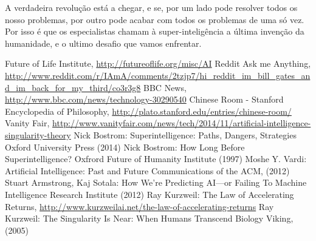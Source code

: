 \documentclass[runningheads,a4paper]{llncs}
\begin{document}
A verdadeira revolução está a chegar, e se, por um lado pode resolver todos os nosso problemas, por outro pode acabar com todos os problemas de uma só vez. Por isso é que os especialistas chamam à super-inteligência a última invenção da humanidade, e o ultimo desafio que vamos enfrentar.

\begin{thebibliography}{4}

   Future of Life Institute, \url{http://futureoflife.org/misc/AI}
   Reddit Ask me Anything, \url{http://www.reddit.com/r/IAmA/comments/2tzjp7/hi_reddit_im_bill_gates_and_im_back_for_my_third/co3r3g8}
   BBC News, \url{http://www.bbc.com/news/technology-30290540}
   Chinese Room - Stanford Encyclopedia of Philosophy, \url{http://plato.stanford.edu/entries/chinese-room/}
   Vanity Fair, \url{http://www.vanityfair.com/news/tech/2014/11/artificial-intelligence-singularity-theory}
   Nick Bostrom:
    Superintelligence: Paths, Dangers, Strategies
    Oxford University Press (2014)
   Nick Bostrom:
    How Long Before Superintelligence?
    Oxfrord Future of Humanity Institute (1997)
   Moshe Y. Vardi:
    Artificial Intelligence: Past and Future
    Communications of the ACM, (2012)
   Stuart Armstrong, Kaj Sotala:
    How We’re Predicting AI—or Failing To
    Machine Intelligence Research Institute (2012)
   Ray Kurzweil:
    The Law of Accelerating Returns,
    \url{http://www.kurzweilai.net/the-law-of-accelerating-returns}
   Ray Kurzweil:
    The Singularity Is Near: When Humans Transcend Biology
    Viking, (2005)

\end{thebibliography}
\end{document}
